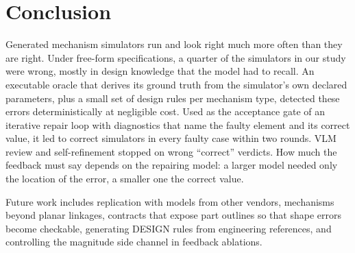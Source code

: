 \section{Conclusion}\label{sec:conclusion}

Generated mechanism simulators run and look right much more often than they are right. Under free-form specifications, a quarter of the simulators in our study were wrong, mostly in design knowledge that the model had to recall. An executable oracle that derives its ground truth from the simulator's own declared parameters, plus a small set of design rules per mechanism type, detected these errors deterministically at negligible cost. Used as the acceptance gate of an iterative repair loop with diagnostics that name the faulty element and its correct value, it led to correct simulators in every faulty case within two rounds. VLM review and self-refinement stopped on wrong ``correct'' verdicts. How much the feedback must say depends on the repairing model: a larger model needed only the location of the error, a smaller one the correct value.

Future work includes replication with models from other vendors, mechanisms beyond planar linkages, contracts that expose part outlines so that shape errors become checkable, generating DESIGN rules from engineering references, and controlling the magnitude side channel in feedback ablations.
